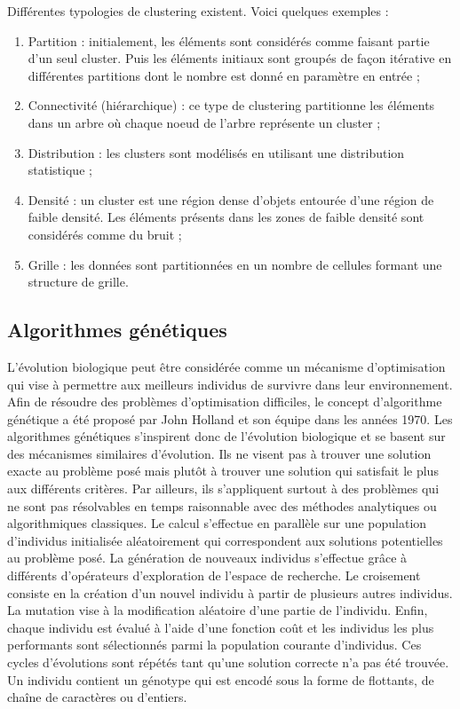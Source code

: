 \documentclass[draft]{llncs}
\begin{document}
Différentes typologies de clustering existent. Voici quelques exemples : 

\begin{enumerate}
  \item Partition : initialement, les éléments sont considérés comme faisant partie d'un seul cluster. Puis les éléments initiaux sont groupés de façon itérative en différentes partitions dont le nombre est donné en paramètre en entrée ;
  \item Connectivité (hiérarchique) : ce type de clustering partitionne les éléments dans un arbre où chaque noeud de l'arbre représente un cluster ;
  \item Distribution : les clusters sont modélisés en utilisant une distribution statistique ;
  \item Densité : un cluster est une région dense d'objets entourée d'une région de faible densité. Les éléments présents dans les zones de faible densité sont considérés comme du bruit ;
  \item Grille : les données sont partitionnées en un nombre de cellules formant une structure de grille.
\end{enumerate}



\subsection{Algorithmes génétiques}
 
L'évolution biologique peut être considérée comme un mécanisme d'optimisation qui vise à permettre aux meilleurs individus de survivre dans leur environnement.
Afin de résoudre des problèmes d'optimisation difficiles, le concept d'algorithme génétique a été proposé par John Holland et son équipe \cite{Holland:1975} dans les années 1970. 
Les algorithmes génétiques s'inspirent donc de l'évolution biologique et se basent sur des mécanismes similaires d'évolution.
Ils ne visent pas à trouver une solution exacte au problème posé mais plutôt à trouver une solution qui satisfait le plus aux différents critères.
Par ailleurs, ils s'appliquent surtout à des problèmes qui ne sont pas résolvables en temps raisonnable avec des méthodes analytiques ou algorithmiques classiques.
Le calcul s'effectue en parallèle sur une population d’individus initialisée aléatoirement qui correspondent aux solutions potentielles au problème posé. 
La génération de nouveaux individus s'effectue grâce à différents d’opérateurs d’exploration de l'espace de recherche. 
Le croisement consiste en la création d’un nouvel individu à partir de plusieurs autres individus. 
La mutation vise à la modification aléatoire d’une partie de l’individu. 
Enfin, chaque individu est évalué à l'aide d'une fonction coût et les individus les plus performants sont sélectionnés parmi la population courante d'individus.
Ces cycles d'évolutions sont répétés tant qu'une solution correcte n'a pas été trouvée.
Un individu contient un génotype qui est encodé sous la forme de flottants, de chaîne de caractères ou d'entiers.
\end{document}

